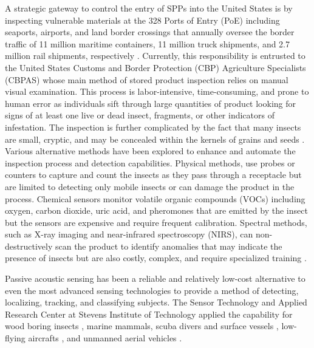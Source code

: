 A strategic gateway to control the entry of SPPs into the United States is by inspecting vulnerable materials at the 328 Ports of Entry (PoE) including seaports, airports, and land border crossings that annually oversee the border traffic of 11 million maritime containers, 11 million truck shipments, and 2.7 million rail shipments, respectively \cite{PortsEntryUS2025}. Currently, this responsibility is entrusted to the United States Customs and Border Protection (CBP) Agriculture Specialists (CBPAS) whose main method of stored product inspection relies on manual visual examination. This process is labor-intensive, time-consuming, and prone to human error as individuals sift through large quantities of product looking for signs of at least one live or dead insect, fragments, or other indicators of infestation. The inspection is further complicated by the fact that many insects are small, cryptic, and may be concealed within the kernels of grains and seeds \cite{service2015a}. Various alternative methods have been explored to enhance and automate the inspection process and detection capabilities. Physical methods, use probes or counters to capture and count the insects as they pass through a receptacle but are limited to detecting only mobile insects or can damage the product in the process. Chemical sensors monitor volatile organic compounds (VOCs) including oxygen, carbon dioxide, uric acid, and pheromones that are emitted by the insect but the sensors are expensive and require frequent calibration. Spectral methods, such as X-ray imaging and near-infrared spectroscopy (NIRS), can non-destructively scan the product to identify anomalies that may indicate the presence of insects but are also costly, complex, and require specialized training \cite{muller-blenkleMethodAcousticStorage2023}.

Passive acoustic sensing has been a reliable and relatively low-cost alternative to even the most advanced sensing technologies to provide a method of detecting, localizing, tracking, and classifying subjects. The Sensor Technology and Applied Research Center at Stevens Institute of Technology applied the capability for wood boring insects \cite{flynnAcousticMethodsInvasive2016, sutinVibroacousticMethodsInsect2017, sutinAutomatedAcousticDetection2019}, marine mammals, scuba divers and surface vessels \cite{sutinStevensPassiveAcoustic2010a, sutinStevensPassiveAcoustic2013, pollaraPassiveAcousticMethods2017, sedunovLowSizeCostAcoustic2022, salloumLowcostMultimodalIntegrated2022, sedunovStevensPassiveAcoustic2022a}, low-flying aircrafts \cite{sutinAcousticDetectionTracking2013, sedunovPassiveAcousticLocalization2013}, and unmanned aerial vehicles \cite{yakubovskiyFeatureExtractionAcoustic2015, salloumAcousticSystemLow2015, sedunovUAVPassiveAcoustic2018, sedunovStevensDroneDetection2019,kadyrovImprovementsStevensDrone2022}. 

